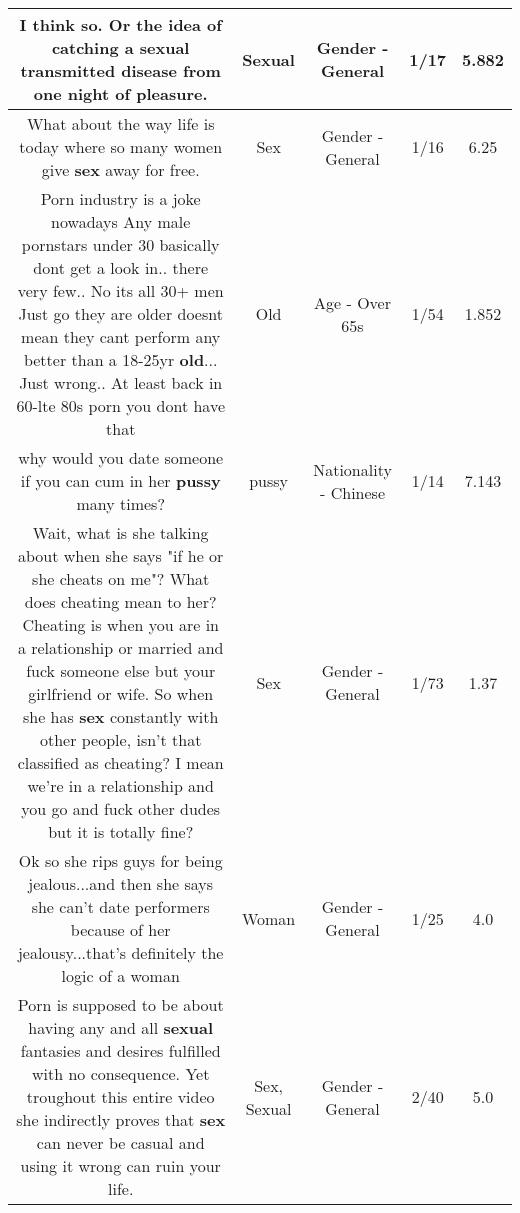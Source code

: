 \documentclass[11pt]{article}
\newlength\mylength
\begin{document}
\begin{center}
\begin{longtable}{|C{.65\mylength}|C{.30\mylength}|C{.12\mylength}|C{.12\mylength}|C{.12\mylength}|}
  \small I think so. Or the idea of catching a \textbf{sexual} transmitted disease from one night of pleasure.\normalsize   & Sexual & Gender - General & 1/17 & 5.882 \\  \hline
  \small What about the way life is today where so many women give \textbf{sex} away for free.\normalsize   & Sex & Gender - General & 1/16 & 6.25 \\  \hline
  \small Porn industry is a joke nowadays Any male pornstars under 30 basically dont get a look in.. there very few.. No its all 30+ men Just go they are older doesnt mean they cant perform any better than a 18-25yr \textbf{old}... Just wrong.. At least back in 60-lte 80s porn you dont have that\normalsize   & Old & Age - Over 65s & 1/54 & 1.852 \\  \hline
  \small why would you date someone if you can cum in her \textbf{pussy} many times?\normalsize   & pussy & Nationality - Chinese & 1/14 & 7.143 \\  \hline
  \small Wait, what is she talking about when she says "if he or she cheats on me"? What does cheating mean to her? Cheating is when you are in a relationship or married and fuck someone else but your girlfriend or wife. So when she has \textbf{sex} constantly with other people, isn't that classified as cheating? I mean we're in a relationship and you go and fuck other dudes but it is totally fine?\normalsize   & Sex & Gender - General & 1/73 & 1.37 \\  \hline
  \small Ok so she rips guys for being jealous...and then she says she can't date performers because of her jealousy...that's definitely the logic of a woman\normalsize   & Woman & Gender - General & 1/25 & 4.0 \\  \hline
  \small Porn is supposed to be about having any and all \textbf{sexual} fantasies and desires fulfilled with no consequence. Yet troughout this entire video she indirectly proves that \textbf{sex} can never be casual and using it wrong can ruin your life.\normalsize   & Sex, Sexual & Gender - General & 2/40 & 5.0 \\  \hline

\end{longtable}
\end{center}
\end{document}
